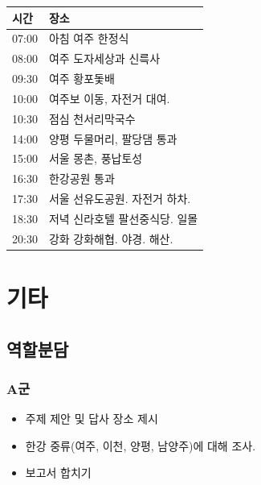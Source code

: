 \documentclass[chapter, oneside]{oblivoir}
\begin{document}
\begin{table}[ht]
    \begin{center}
    \begin{tabular}{rl}
    \multicolumn{1}{l}{시간}     & \multicolumn{1}{l}{장소} \\ \hline
    \multicolumn{1}{r|}{07:00} & 아침   여주 한정식         \\
    \multicolumn{1}{r|}{08:00} & 여주   도자세상과 신륵사      \\
    \multicolumn{1}{r|}{09:30} & 여주   황포돛배           \\
    \multicolumn{1}{r|}{10:00} & 여주보 이동, 자전거 대여.     \\
    \multicolumn{1}{r|}{10:30} & 점심   천서리막국수         \\
    \multicolumn{1}{r|}{14:00} & 양평 두물머리, 팔당댐 통과     \\
    \multicolumn{1}{r|}{15:00} & 서울 몽촌, 풍납토성         \\
    \multicolumn{1}{r|}{16:30} & 한강공원   통과           \\
    \multicolumn{1}{r|}{17:30} & 서울   선유도공원. 자전거 하차. \\
    \multicolumn{1}{r|}{18:30} & 저녁   신라호텔 팔선중식당. 일몰 \\
    \multicolumn{1}{r|}{20:30} & 강화   강화해협. 야경. 해산. 
    \end{tabular}   
    \end{center}
\end{table}





\chapter{기타}
\section{역할분담}
\subsection{A군}
\begin{itemize}
    \item 주제 제안 및 답사 장소 제시
    \item 한강 중류(여주, 이천, 양평, 남양주)에 대해 조사.
    \item {} 보고서 합치기
\end{itemize}
\end{document}
